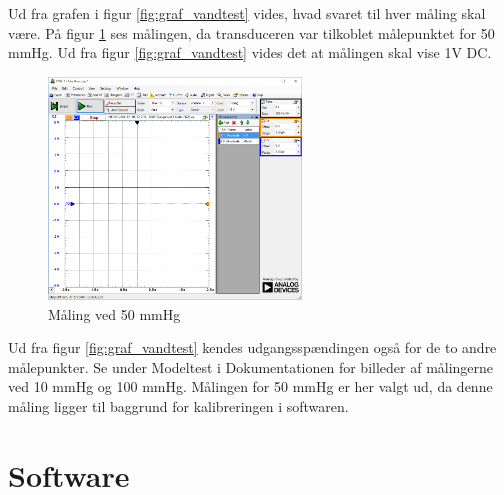 Ud fra grafen i figur \ref{fig:graf_vandtest} vides, hvad svaret til hver måling skal være. På figur \ref{fig:vandtest_måling50} ses målingen, da transduceren var tilkoblet målepunktet for 50 mmHg. Ud fra figur \ref{fig:graf_vandtest} vides det at målingen skal vise 1V DC.  
\begin{figure}[H]
	\centering	\includegraphics[width=0.6\textwidth]{Figurer/50mmhg}
	\caption{Måling ved 50 mmHg}
	\label{fig:vandtest_måling50}
\end{figure}
Ud fra figur \ref{fig:graf_vandtest} kendes udgangsspændingen også for de to andre målepunkter. Se under Modeltest i Dokumentationen for billeder af målingerne ved 10 mmHg og 100 mmHg. Målingen for 50 mmHg er her valgt ud, da denne måling ligger til baggrund for kalibreringen i softwaren. 

\section{Software}
